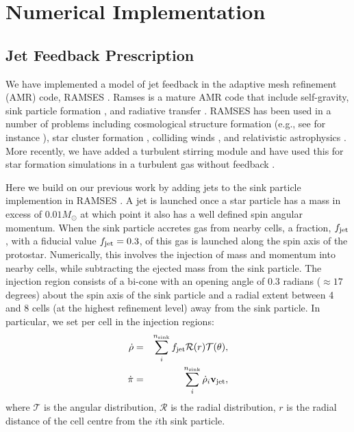 \documentclass[../dissertation.tex]{subfiles}
\begin{document}
\section{Numerical Implementation}\label{sec:jet_implementation}

\subsection{Jet Feedback Prescription}\label{sec:jet_jet feedback}

We have implemented a model of jet feedback in the adaptive mesh refinement (AMR) code, RAMSES
 \citep{2002A&A...385..337T}.  Ramses is a mature AMR code that include self-gravity, sink particle formation \citep{2010MNRAS.409..985D,2014MNRAS.445.4015B}, and radiative transfer \citep{2013MNRAS.436.2188R,2015MNRAS.449.4380R}.  RAMSES has been used in a number of problems including cosmological structure formation (e.g., see for instance \citealt{2016MNRAS.463.1462O}), star cluster formation \citep{2017MNRAS.472.4155G}, %
colliding winds \citep{2011MNRAS.418.2618L,2017MNRAS.468.2655L}, and relativistic astrophysics \citep{2013A&A...560A..79L,2017arXiv170204362L}. More recently, we have added a turbulent stirring module and have used this for star formation simulations in a turbulent gas without feedback \citep{2017MNRAS.465.1316M}.

Here we build on our previous work \citep{2017MNRAS.465.1316M} by adding jets to the sink particle implemention in RAMSES \citep{2010MNRAS.409..985D,2014MNRAS.445.4015B}.   A jet is launched once a star particle has a mass in excess of $0.01 M_\odot$ at which point it also has a well defined spin angular momentum.
When the sink particle accretes gas from nearby cells, a fraction, $f_{\rm jet}$, with a fiducial value $f_{\rm jet} = 0.3$, of this gas is launched along the spin axis of the protostar.  %
Numerically, this involves the injection of mass and momentum into nearby cells, while subtracting the ejected mass from the sink particle.
The injection region consists of a bi-cone with an opening angle of $0.3$ radians ($\approx 17$ degrees) about the spin axis of the sink particle
and a radial extent between 4 and 8 cells (at the highest refinement level) away from the sink particle.
In particular, we set per cell in the injection regions:
\begin{eqnarray}
\dot{\rho} &=& \sum_i^{n_{\rm sink}} f_{\rm jet}\mathcal{R}(r)\mathcal{T}(\theta), \\
\dot{\bf \pi} &=& \sum_i^{n_{\rm sink}}\dot{\rho}_i {\bf v}_{\rm jet},
\end{eqnarray}
where $\mathcal{T}$ is the angular distribution, $\mathcal{R}$ is the radial distribution, $r$ is the radial distance of the cell centre from the $i$th sink particle.
\end{document}
